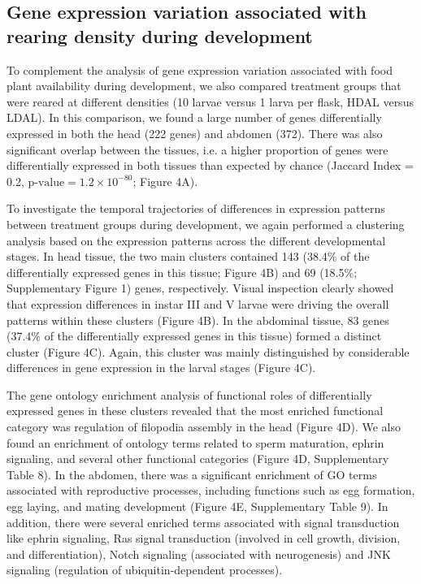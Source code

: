 \documentclass[lineno]{wiley-article}
\begin{document}
\afterpage{\FloatBarrier}


\subsection{Gene expression variation associated with rearing density during development}
To complement the analysis of gene expression variation associated with food plant availability during development, we also compared treatment groups that were reared at different densities (10 larvae versus 1 larva per flask, HDAL versus LDAL). In this comparison, we found a large number of genes differentially expressed in both the head (222 genes) and abdomen (372). There was also significant overlap between the tissues, i.e. a higher proportion of genes were differentially expressed in both tissues than expected by chance (Jaccard Index = 0.2, $\text{p-value} = 1.2 \times 10^{-80}$; Figure 4A).

To investigate the temporal trajectories of differences in expression patterns between treatment groups during development, we again performed a clustering analysis based on the expression patterns across the different developmental stages. In head tissue, the two main clusters contained 143 (38.4\% of the differentially expressed genes in this tissue; Figure 4B) and 69 (18.5\%; Supplementary Figure 1) genes, respectively. Visual inspection clearly showed that expression differences in instar III and V larvae were driving the overall patterns within these clusters (Figure 4B). In the abdominal tissue, 83 genes (37.4\% of the differentially expressed genes in this tissue) formed a distinct cluster (Figure 4C). Again, this cluster was mainly distinguished by considerable differences in gene expression in the larval stages (Figure 4C).

The gene ontology enrichment analysis of functional roles of differentially expressed genes in these clusters revealed that the most enriched functional category was regulation of filopodia assembly in the head (Figure 4D). We also found an enrichment of ontology terms related to sperm maturation, ephrin signaling, and several other functional categories (Figure 4D, Supplementary Table 8). In the abdomen, there was a significant enrichment of GO terms associated with reproductive processes, including functions such as egg formation, egg laying, and mating development (Figure 4E, Supplementary Table 9). In addition, there were several enriched terms associated with signal transduction like ephrin signaling, Ras signal transduction (involved in cell growth, division, and differentiation), Notch signaling (associated with neurogenesis) and JNK signaling (regulation of ubiquitin-dependent processes).
\end{document}
